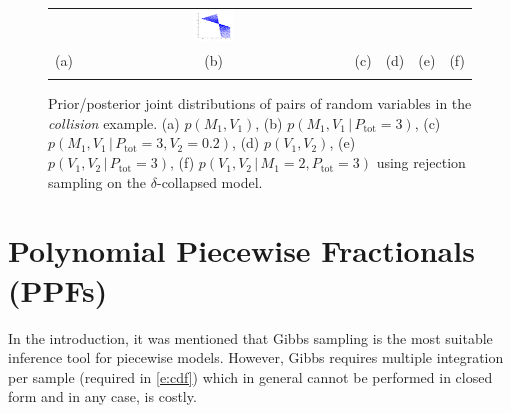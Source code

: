\documentclass[letterpaper]{article}
\newcommand{\pr}{p}
\newcommand{\nn}{0.16}
\begin{document}
\begin{figure}
\begin{center}
\begin{tabular}{cccccc}
& \hspace{-3mm} \includegraphics[width=\nn\textwidth]{Figs/colV1V2givenPis3M1is2.png}
\vspace{-1.5mm}
\\
   \hspace{-5mm} \footnotesize(a) 
& \hspace{-4mm} \footnotesize(b) 
& \hspace{-3mm} \footnotesize(c) 
&\hspace{-1mm} \footnotesize(d) 
&\hspace{-1mm} \footnotesize(e) 
&\hspace{-1mm} \footnotesize(f)\\
\multicolumn{6}{c}{}
\end{tabular}
\end{center}
\vspace{-8mm}
\caption{\footnotesize
Prior/posterior joint distributions of pairs of random variables in the \emph{collision} example. 
(a) $\pr(M_1, V_1)$,
(b) $\pr(M_1, V_1 \, | \, P_\text{tot} = 3)$,
(c) $\pr(M_1, V_1 \, | \, P_\text{tot} = 3, V_2 = 0.2)$,
(d) $\pr(V_1, V_2)$,
(e) $\pr(V_1, V_2 \, | \, P_\text{tot} = 3)$,
(f) $\pr(V_1, V_2 \, | \, M_1 =2, P_\text{tot} = 3)$
using rejection sampling on the $\delta$-collapsed model.
} 
\label{fig:mom}
\end{figure}




\section{Polynomial Piecewise Fractionals 
(PPFs)}
\label{sect:ppfs}
In the introduction, it was mentioned that Gibbs sampling is the most suitable inference tool for piecewise models.
However, Gibbs requires multiple integration per sample (required in \ref{e:cdf})
 which in general cannot be performed in closed form and in any case, is costly.
\end{document}
